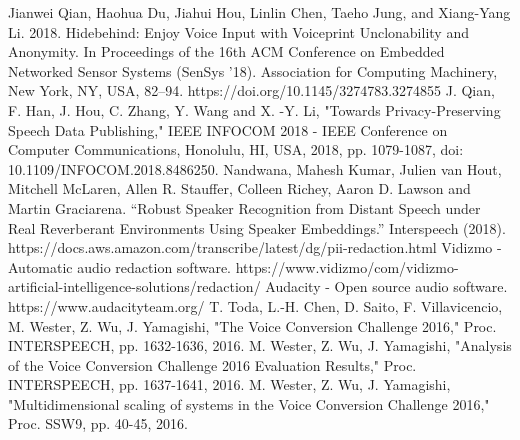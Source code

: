 \documentclass[journal]{IEEEtran} %
\begin{document}
\begin{thebibliography}{00}
     Jianwei Qian, Haohua Du, Jiahui Hou, Linlin Chen, Taeho Jung, and Xiang-Yang Li. 2018. Hidebehind: Enjoy Voice Input with Voiceprint Unclonability and Anonymity. In Proceedings of the 16th ACM Conference on Embedded Networked Sensor Systems (SenSys '18). Association for Computing Machinery, New York, NY, USA, 82–94. https://doi.org/10.1145/3274783.3274855
     J. Qian, F. Han, J. Hou, C. Zhang, Y. Wang and X. -Y. Li, "Towards Privacy-Preserving Speech Data Publishing," IEEE INFOCOM 2018 - IEEE Conference on Computer Communications, Honolulu, HI, USA, 2018, pp. 1079-1087, doi: 10.1109/INFOCOM.2018.8486250.
     Nandwana, Mahesh Kumar, Julien van Hout, Mitchell McLaren, Allen R. Stauffer, Colleen Richey, Aaron D. Lawson and Martin Graciarena. “Robust Speaker Recognition from Distant Speech under Real Reverberant Environments Using Speaker Embeddings.” Interspeech (2018).
     https://docs.aws.amazon.com/transcribe/latest/dg/pii-redaction.html
     Vidizmo - Automatic audio redaction software. https://www.vidizmo/com/vidizmo-artificial-intelligence-solutions/redaction/
     Audacity - Open source audio software. https://www.audacityteam.org/
     T. Toda, L.-H. Chen, D. Saito, F. Villavicencio, M. Wester, Z. Wu, J. Yamagishi, "The Voice Conversion Challenge 2016," Proc. INTERSPEECH, pp. 1632-1636, 2016.
     M. Wester, Z. Wu, J. Yamagishi, "Analysis of the Voice Conversion Challenge 2016 Evaluation Results," Proc. INTERSPEECH, pp. 1637-1641, 2016.
     M. Wester, Z. Wu, J. Yamagishi, "Multidimensional scaling of systems in the Voice Conversion Challenge 2016," Proc. SSW9, pp. 40-45, 2016.
\end{thebibliography}
\end{document}
